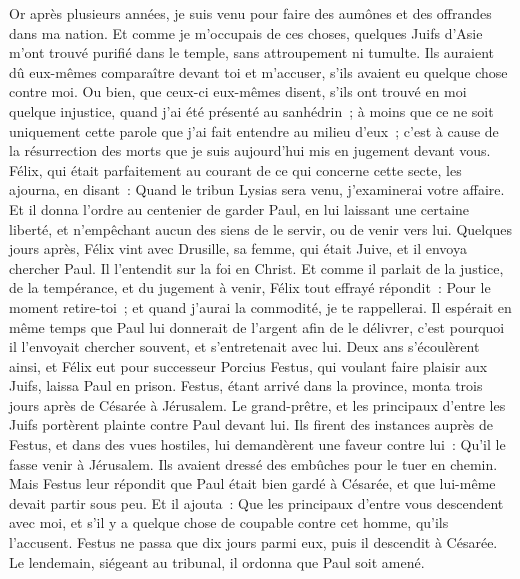 \begin{multicols}{2}
Or après plusieurs années, je suis venu pour faire des aumônes et des offrandes dans ma nation.
Et comme je m'occupais de ces choses, quelques Juifs d'Asie m'ont trouvé purifié dans le temple, sans attroupement ni tumulte.
Ils auraient dû eux-mêmes comparaître devant toi et m'accuser, s'ils avaient eu quelque chose contre moi.
Ou bien, que ceux-ci eux-mêmes disent, s'ils ont trouvé en moi quelque injustice, quand j'ai été présenté au sanhédrin~;
à moins que ce ne soit uniquement cette parole que j'ai fait entendre au milieu d'eux~; c'est à cause de la résurrection des morts que je suis aujourd'hui mis en jugement devant vous.
Félix, qui était parfaitement au courant de ce qui concerne cette secte, les ajourna, en disant~: Quand le tribun Lysias sera venu, j'examinerai votre affaire.
Et il donna l'ordre au centenier de garder Paul, en lui laissant une certaine liberté, et n'empêchant aucun des siens de le servir, ou de venir vers lui.
Quelques jours après, Félix vint avec Drusille, sa femme, qui était Juive, et il envoya chercher Paul. Il l'entendit sur la foi en Christ.
Et comme il parlait de la justice, de la tempérance, et du jugement à venir, Félix tout effrayé répondit~: Pour le moment retire-toi~; et quand j'aurai la commodité, je te rappellerai.
Il espérait en même temps que Paul lui donnerait de l'argent afin de le délivrer, c'est pourquoi il l'envoyait chercher souvent, et s'entretenait avec lui.
Deux ans s'écoulèrent ainsi, et Félix eut pour successeur Porcius Festus, qui voulant faire plaisir aux Juifs, laissa Paul en prison.
\VerseOne{}Festus, étant arrivé dans la province, monta trois jours après de Césarée à Jérusalem.
Le grand-prêtre, et les principaux d'entre les Juifs portèrent plainte contre Paul devant lui. Ils firent des instances auprès de Festus, et dans des vues hostiles,
lui demandèrent une faveur contre lui~: Qu'il le fasse venir à Jérusalem. Ils avaient dressé des embûches pour le tuer en chemin.
Mais Festus leur répondit que Paul était bien gardé à Césarée, et que lui-même devait partir sous peu.
Et il ajouta~: Que les principaux d'entre vous descendent avec moi, et s'il y a quelque chose de coupable contre cet homme, qu'ils l'accusent.
Festus ne passa que dix jours parmi eux, puis il descendit à Césarée. Le lendemain, siégeant au tribunal, il ordonna que Paul soit amené.

\end{multicols}
